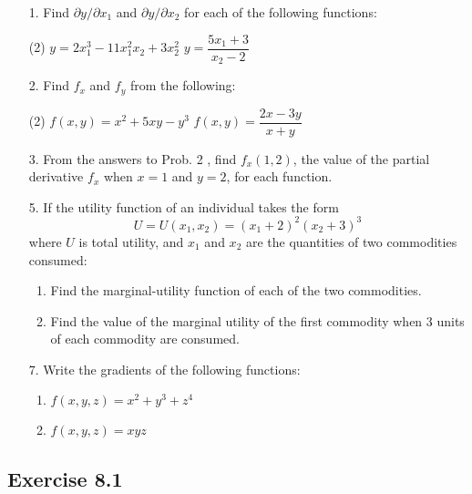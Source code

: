 \documentclass{./../../Latex/homework}
\begin{document}
\begin{enumerate}

\item[1.] Find $\partial y / \partial x_{1}$ and $\partial y / \partial x_{2}$ for each of the following functions:
\begin{tasks}(2)
\task[(a)] $y=2 x_{1}^{3}-11 x_{1}^{2} x_{2}+3 x_{2}^{2}$
\task[(d)]$y=\dfrac{5 x_{1}+3}{x_{2}-2}$ 
\end{tasks}

\item[2.] Find $f_{x}$ and $f_{y}$ from the following:
\begin{tasks}(2)
\task[(a)] $f(x, y)=x^{2}+5 x y-y^{3}$
\task[(b)] $f(x, y)=\dfrac{2 x-3 y}{x+y}$
\end{tasks}


\item[3.] From the answers to Prob. 2 , find $f_{x}(1,2)$, the value of the partial derivative $f_{x}$ when $x=1$ and $y=2$, for each function.

\item[5.] If the utility function of an individual takes the form
$$U=U\left(x_{1}, x_{2}\right)=\left(x_{1}+2\right)^{2}\left(x_{2}+3\right)^{3}$$
where $U$ is total utility, and $x_{1}$ and $x_{2}$ are the quantities of two commodities consumed:
\begin{enumerate}
  \item Find the marginal-utility function of each of the two commodities.
  \item Find the value of the marginal utility of the first commodity when 3 units of each commodity are consumed.
\end{enumerate}

\item[7.] Write the gradients of the following functions:
\begin{enumerate}
\item $f(x, y, z)=x^{2}+y^{3}+z^{4}$
\item $f(x, y, z)=x y z$
\end{enumerate}
\end{enumerate}

\subsection*{Exercise 8.1}
\end{document}
